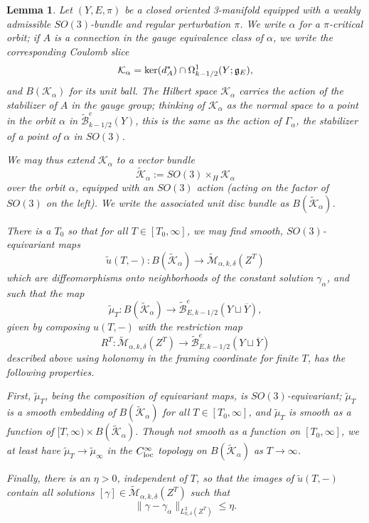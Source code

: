 \documentclass{memo-l}
\newtheorem{lemma}[theorem]{Lemma}
\theoremstyle{definition}
\theoremstyle{remark}
\numberwithin{section}{chapter}
\numberwithin{equation}{chapter}
\begin{document}
\begin{lemma}\label{maingluinglemma}Let $(Y,E,\pi)$ be a closed oriented 3-manifold equipped with a weakly admissible $SO(3)$-bundle and regular perturbation $\pi$. We write $\alpha$ for a $\pi$-critical orbit; if $A$ is a connection in the gauge equivalence class of $\alpha$, we write the corresponding Coulomb slice 
$$\mathcal K_\alpha = \textup{ker}(d^*_A) \cap \Omega^1_{k-1/2}(Y;\mathfrak g_E),$$ 
and $B(\mathcal K_\alpha)$ for its unit ball. The Hilbert space $\mathcal K_\alpha$ carries the action of the stabilizer of $A$ in the gauge group; thinking of $\mathcal K_\alpha$ as the normal space to a point in the orbit $\alpha$ in $\widetilde{\mathcal B}^e_{k-1/2}(Y)$, this is the same as the action of $\Gamma_\alpha$, the stabilizer of a point of $\alpha$ in $SO(3)$.

We may thus extend $\mathcal K_\alpha$ to a vector bundle 
$$\widetilde{\mathcal K}_\alpha := SO(3) \times_H \mathcal K_\alpha$$ 
over the orbit $\alpha$, equipped with an $SO(3)$ action (acting on the factor of $SO(3)$ on the left). We write the associated unit disc bundle as $B(\widetilde{\mathcal K}_\alpha)$.

There is a $T_0$ so that for all $T \in [T_0, \infty]$, we may find smooth, $SO(3)$-equivariant maps $$\widetilde u(T, -): B(\widetilde{\mathcal K}_\alpha) \to \widetilde{\mathcal M}_{\alpha, k,\delta}(Z^T)$$ which are diffeomorphisms onto neighborhoods of the constant solution $\gamma_\alpha$, and such that the map $$\widetilde{\mu}_T: B(\widetilde{\mathcal K}_\alpha) \to \widetilde{\mathcal B}^e_{E,k-1/2}(Y \sqcup \overline Y),$$ given by composing $u(T, -)$ with the restriction map $$R^T: \widetilde{\mathcal M}_{\alpha, k,\delta}(Z^T) \to \widetilde{\mathcal B}^e_{E,k-1/2}(Y \sqcup \overline Y)$$ described above using holonomy in the framing coordinate for finite $T$, has the following properties.

First, $\widetilde{\mu}_T$, being the composition of equivariant maps, is $SO(3)$-equivariant; $\widetilde{\mu}_T$ is a smooth embedding of $B(\widetilde{\mathcal K}_\alpha)$ for all $T \in [T_0, \infty]$, and $\widetilde{\mu}_T$ is smooth as a function of $[T, \infty) \times B(\widetilde{\mathcal K}_\alpha)$. Though not smooth as a function on $[T_0, \infty]$, we at least have $\widetilde{\mu}_T \to \widetilde{\mu}_\infty$ in the $C^\infty_{\textup{loc}}$ topology on $B(\widetilde{\mathcal K}_\alpha)$ as $T \to \infty$.

Finally, there is an $\eta > 0$, independent of $T$, so that the images of $\widetilde u(T, -)$ contain all solutions $[\gamma] \in \widetilde{\mathcal M}_{\alpha, k, \delta}(Z^T)$ such that $$\|\gamma - \gamma_\alpha\|_{L^2_{k,\delta}(Z^T)} \leq \eta.$$


\end{lemma}
\end{document}
